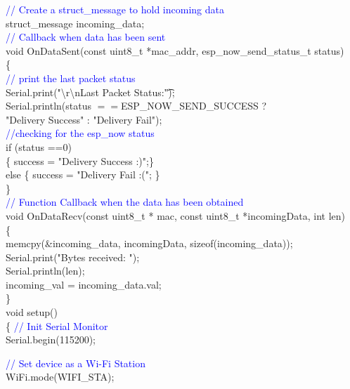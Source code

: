 \documentclass[12pt,a4paper]{article}
\begin{document}
\textcolor{blue}{// Create a struct\_message to hold incoming data}\\
struct\_message incoming\_data;\\

\textcolor{blue}{// Callback when data has been sent}\\
void OnDataSent(const uint8\_t *mac\_addr, esp\_now\_send\_status\_t status)\\
\{\\
\textcolor{blue}{// print the last packet status}\\
  Serial.print("\textbackslash r\textbackslash nLast Packet Status:\t");\\
  Serial.println(status $== $ESP\_NOW\_SEND\_SUCCESS ?\\ "Delivery Success" : "Delivery Fail");\\ 
  \textcolor{blue}{//checking for the esp\_now status}\\
  if (status ==0)\\
  \{ success = "Delivery Success :)";\}\\
  else \{ success = "Delivery Fail :("; \}\\
\}\\

\textcolor{blue}{// Function Callback when the data has been obtained}\\
void OnDataRecv(const uint8\_t * mac, const uint8\_t *incomingData, int len)\\
\{\\

  memcpy(\&incoming\_data, incomingData, sizeof(incoming\_data));\\
  Serial.print("Bytes received: ");\\
  Serial.println(len);\\
  incoming\_val = incoming\_data.val;\\
\}\\[15pt]
 
void setup()\\
\{
  \textcolor{blue}{// Init Serial Monitor}\\
  Serial.begin(115200);

  \textcolor{blue}{// Set device as a Wi-Fi Station}\\
  WiFi.mode(WIFI\_STA);\\
\end{document}
